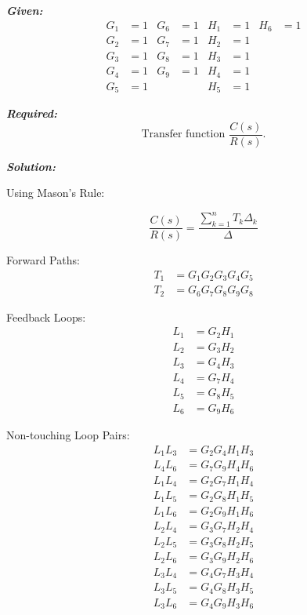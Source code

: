 ﻿\documentclass[11pt]{article}
\begin{document}
\noindent\textbf{\textit{Given:}}
\[
\begin{aligned}
G_1 &= 1 & G_6 &= 1 & H_1 &= 1 & H_6 &= 1 \\
G_2 &= 1 & G_7 &= 1 & H_2 &= 1 & & \\
G_3 &= 1 & G_8 &= 1 & H_3 &= 1 & & \\
G_4 &= 1 & G_9 &= 1 & H_4 &= 1 & & \\
G_5 &= 1 & & & H_5 &= 1 & & 
\end{aligned}
\]

\vspace{12pt}

\noindent\textbf{\textit{Required:}}
\[
\text{Transfer function } \frac{C(s)}{R(s)}.
\]

\vspace{12pt}

\noindent \textbf{\textit{Solution:}}

\vspace{2pt}
{Using Mason's Rule:}

\[
\frac{C(s)}{R(s)} = \frac{\sum_{k=1}^{n} T_k \Delta_k}{\Delta}
\]

Forward Paths:
\begin{align*}
T_1 &= G_1 G_2 G_3 G_4 G_5 \\
T_2 &= G_6 G_7 G_8 G_9 G_8
\end{align*}

\vspace{0.5em}

Feedback Loops:
\begin{align*}
L_1 &= G_2 H_1 \\
L_2 &= G_3 H_2 \\
L_3 &= G_4 H_3 \\
L_4 &= G_7 H_4 \\
L_5 &= G_8 H_5 \\
L_6 &= G_9 H_6
\end{align*}

\vspace{0.5em}

Non-touching Loop Pairs:
\begin{align*}
L_1 L_3 &= G_2 G_4 H_1 H_3 \\
L_4 L_6 &= G_7 G_9 H_4 H_6 \\
L_1 L_4 &= G_2 G_7 H_1 H_4 \\
L_1 L_5 &= G_2 G_8 H_1 H_5 \\
L_1 L_6 &= G_2 G_9 H_1 H_6 \\
L_2 L_4 &= G_3 G_7 H_2 H_4 \\
L_2 L_5 &= G_3 G_8 H_2 H_5 \\
L_2 L_6 &= G_3 G_9 H_2 H_6 \\
L_3 L_4 &= G_4 G_7 H_3 H_4 \\
L_3 L_5 &= G_4 G_8 H_3 H_5 \\
L_3 L_6 &= G_4 G_9 H_3 H_6
\end{align*}
\end{document}
